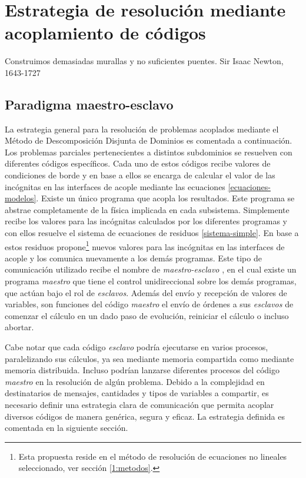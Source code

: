 \chapter{Estrategia de resolución mediante acoplamiento de códigos}
\label{chap2}
\chapterquote
{Construimos demasiadas murallas y no suficientes puentes.}
{Sir Isaac Newton, 1643-1727}

\section{Paradigma maestro-esclavo}
\label{2:maestro-esclavo}
La estrategia general para la resolución de problemas acoplados mediante el Método de Descomposición Disjunta de Dominios es comentada a continuación.
Los problemas parciales pertenecientes a distintos subdominios se resuelven con diferentes códigos específicos.
Cada uno de estos códigos recibe valores de condiciones de borde y en base a ellos se encarga de calcular el valor de las incógnitas en las interfaces de acople mediante las ecuaciones \ref{ecuaciones-modelos}.
Existe un único programa que acopla los resultados.
Este programa se abstrae completamente de la física implicada en cada subsistema.
Simplemente recibe los valores para las incógnitas calculados por los diferentes programas y con ellos resuelve el sistema de ecuaciones de residuos \ref{sistema-simple}.
En base a estos residuos propone\footnote{
Esta propuesta reside en el método de resolución de ecuaciones no lineales seleccionado, ver sección \ref{1:metodos}.
} nuevos valores para las incógnitas en las interfaces de acople y los comunica nuevamente a los demás programas.
Este tipo de comunicación utilizado recibe el nombre de \textit{maestro-esclavo} \cite{maestro-esclavo},
en el cual existe un programa \textit{maestro} que tiene el control unidireccional sobre los demás programas, que actúan bajo el rol de \textit{esclavos}.
Además del envío y recepción de valores de variables, son funciones del código \textit{maestro} el envío de órdenes a sus \textit{esclavos} de comenzar el cálculo en un dado paso de evolución, reiniciar el cálculo o incluso abortar.

Cabe notar que cada código \textit{esclavo} podría ejecutarse en varios procesos, paralelizando sus cálculos,
ya sea mediante memoria compartida como mediante memoria distribuida.
Incluso podrían lanzarse diferentes procesos del código \textit{maestro} en la resolución de algún problema.
Debido a la complejidad en destinatarios de mensajes, cantidades y tipos de variables a compartir,
es necesario definir una estrategia clara de comunicación
que permita acoplar diversos códigos de manera genérica, segura y eficaz.
La estrategia definida es comentada en la siguiente sección.

